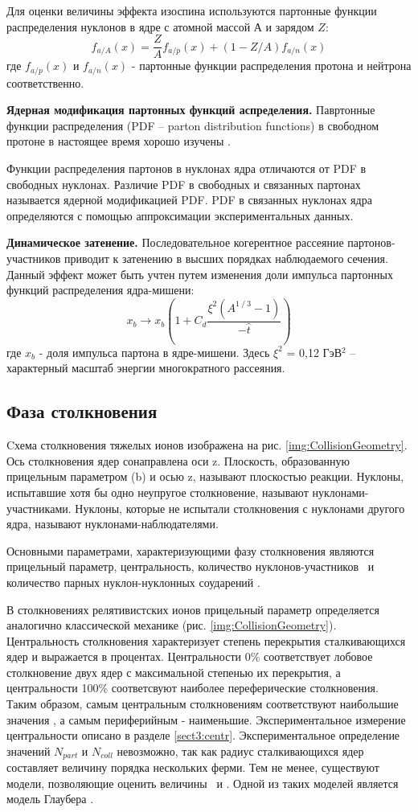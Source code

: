 Для оценки величины эффекта изоспина используются партонные функции распределения нуклонов в ядре с атомной массой $А$ и зарядом $Z$:
$$f_{a/A}(x) = \frac{Z}{A}f_{a/p}(x)+\left(1-Z/A \right) f_{a/n}(x)$$
где $f_{a/p}(x)$ и $f_{a/n}(x)$ - партонные функции распределения протона и нейтрона соответственно. 

\textbf{Ядерная модификация партонных функций аспределения.}
Павртонные функции распределения (PDF -- parton distribution functions) в свободном протоне в настоящее время хорошо изучены \cite{PDF1, PDF2, PDF3}.

Функции распределения партонов в нуклонах ядра отличаются от PDF в свободных нуклонах. Различие PDF в свободных и связанных партонах называется ядерной модификацией PDF. 
PDF в связанных нуклонах ядра определяются с помощью аппроксимации экспериментальных данных.

\textbf{Динамическое затенение.}
Последовательное когерентное рассеяние партонов-участников приводит к затенению в высших порядках наблюдаемого сечения. Данный эффект может быть учтен путем изменения доли импульса партонных функций распределения ядра-мишени:
$$x_b \rightarrow x_b \left(1+C_d  \frac{\xi^2 (A^{1⁄3}-1)}{-\hat{t}} \right)$$
где $x_b$ - доля импульса партона в ядре-мишени. Здесь $\xi ^2$ = 0,12 ГэВ$^2$ – характерный масштаб энергии многократного рассеяния. 


\subsection{Фаза столкновения} 
Cхема столкновения тяжелых ионов изображена на рис. \ref{img:CollisionGeometry}. Ось столкновения ядер сонаправлена оси z. Плоскость, образованную прицельным параметром (b) и осью z, называют плоскостью реакции.  
Нуклоны, испытавшие хотя бы одно неупругое столкновение, называют нуклонами-участниками. Нуклоны, которые не испытали столкновения с нуклонами другого ядра, называют нуклонами-наблюдателями.

Основными параметрами, характеризующими фазу столкновения являются прицельный параметр, центральность, количество нуклонов-участников \Npart \ и количество парных нуклон-нуклонных соударений \Ncoll.

В столкновениях релятивистских ионов прицельный параметр определяется аналогично классической механике (рис. \ref{img:CollisionGeometry}). Центральность столкновения характеризует степень перекрытия сталкивающихся ядер и выражается в процентах. Центральности 0\% соответствует лобовое столкновение двух ядер с максимальной степенью их перекрытия, а центральности 100\% соответсвуют наиболее переферические столкновения.
Таким образом, самым центральным столкновениям соответствуют наибольшие значения \Npart, а самым периферийным - наименьшие.
Экспериментальное измерение центральности описано в разделе \ref{sect3:centr}. Экспериментальное определение значений $N_{part}$ и $N_{coll}$ невозможно, так как радиус сталкивающихся ядер составляет величину порядка нескольких ферми. Тем не менее, существуют модели, позволяющие оценить величины \Npart \ и \Ncoll. Одной из таких моделей является модель Глаубера \cite{Glauber}.

